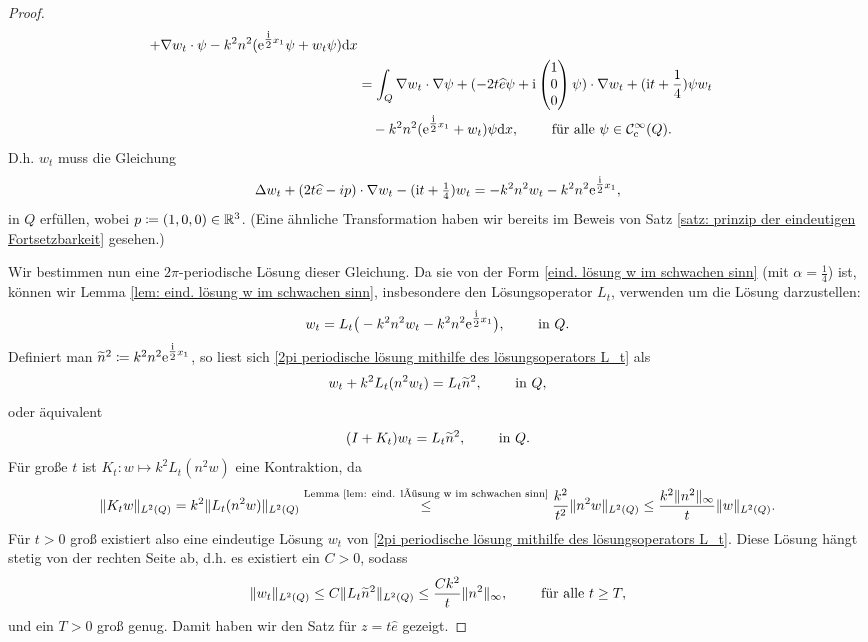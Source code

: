 \begin{proof}
\begin{align*}
		+\nabla w_t\cdot\psi-k^2n^2(\mathrm{e}^{\tfrac{\mathrm{i}}{2}x_1}\psi+w_t\psi)\mathrm{d}x\\
		&=\int_Q\nabla w_t\cdot\nabla\psi+(-2t\widehat{e}\psi+\mathrm{i}\begin{pmatrix}1\\0\\0\end{pmatrix}\psi)\cdot\nabla w_t+(\mathrm{i} t+\frac{1}{4})\psi w_t\\
		&\quad-k^2n^2(\mathrm{e}^{\tfrac{\mathrm{i}}{2}x_1}+w_t)\psi \mathrm{d}x,\qquad\text{ für alle }\psi\in\mathcal{C}_{\mathrm{c}}^\infty(Q).
	\end{align*}
	D.h. \(w_t\) muss die Gleichung
	\begin{equation*}
		\Delta w_t+(2t\widehat{e}-ip)\cdot\nabla w_t-(\mathrm{i} t+\tfrac{1}{4})w_t=-k^2n^2w_t-k^2n^2\mathrm{e}^{\tfrac{\mathrm{i}}{2}x_1},
	\end{equation*}
	in \(Q\) erfüllen, wobei \(p\coloneqq(1,0,0)\in\mathbb{R}^3\). (Eine ähnliche Transformation haben wir bereits im Beweis von Satz \ref{satz: prinzip der eindeutigen Fortsetzbarkeit} gesehen.)
	
	Wir bestimmen nun eine \(2\pi\)-periodische Lösung dieser Gleichung. Da sie von der Form \eqref{eind. lösung w im schwachen sinn} (mit \(\alpha=\tfrac{1}{4}\)) ist, können wir Lemma \ref{lem: eind. lösung w im schwachen sinn}, insbesondere den Lösungsoperator \(L_t\), verwenden um die Lösung darzustellen:
	\begin{equation}
		\label{2pi periodische lösung mithilfe des lösungsoperators L_t}
		w_t=L_t\big(-k^2n^2w_t-k^2n^2\mathrm{e}^{\tfrac{\mathrm{i}}{2}x_1}\big),\qquad\text{ in }Q.
	\end{equation}
	Definiert man \(\widetilde{n}^2\coloneqq k^2n^2\mathrm{e}^{\tfrac{\mathrm{i}}{2}x_1}\), so liest sich \eqref{2pi periodische lösung mithilfe des lösungsoperators L_t} als
	\begin{equation*}
		w_t+k^2L_t(n^2w_t)=L_t\widetilde{n}^2,\qquad\text{ in }Q,
	\end{equation*}
	oder äquivalent
	\begin{equation*}
		(I+K_t)w_t=L_t\widetilde{n}^2,\qquad\text{ in }Q.
	\end{equation*}
	Für große \(t\) ist \(K_t\colon w\mapsto k^2L_t(n^2w)\) eine Kontraktion, da
	\begin{equation*}
		\|K_tw\|_{L^2(Q)}=k^2\|L_t(n^2w)\|_{L^2(Q)}\overset{\text{\scriptsize Lemma \ref{lem: eind. lösung w im schwachen sinn}}}{\leq}\frac{k^2}{t^2}\|n^2w\|_{L^2(Q)}\leq\frac{k^2\|n^2\|_\infty}{t}\|w\|_{L^2(Q)}.
	\end{equation*}
	Für \(t>0\) groß existiert also eine eindeutige Lösung \(w_t\) von \eqref{2pi periodische lösung mithilfe des lösungsoperators L_t}. Diese Lösung hängt stetig von der rechten Seite ab, d.h. es existiert ein \(C>0\), sodass
	\begin{equation*}
		\|w_t\|_{L^2(Q)}\leq C\|L_t\widetilde{n}^2\|_{L^2(Q)}\leq\frac{Ck^2}{t}\|n^2\|_\infty,\qquad\text{ für alle }t\geq T,
	\end{equation*}
	und ein \(T>0\) groß genug. Damit haben wir den Satz für \(z=t\widehat{e}\) gezeigt.\vspace{2.5mm}
	

\end{proof}
